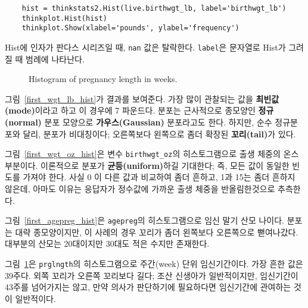 
\begin{verbatim}
    hist = thinkstats2.Hist(live.birthwgt_lb, label='birthwgt_lb')
    thinkplot.Hist(hist)
    thinkplot.Show(xlabel='pounds', ylabel='frequency')
\end{verbatim}

Hist에 인자가 판다스 시리즈일 때, {\tt nan} 값은 탈락한다. 
{\tt label}은 문자열로 Hist가 그려질 때 범례에 나타난다. 


\begin{figure}
\caption{Histogram of pregnancy length in weeks.}
\label{first_prglngth_hist}
\end{figure}

그림~\ref{first_wgt_lb_hist}가 결과를 보여준다.
가장 많이 관찰되는 값을 {\bf 최빈값(mode)}이라고 하고 이 경우에 7 파운드다. 
분포는 근사적으로 종모양인 {\bf 정규(normal)} 분포 모양으로 
{\bf 가우스(Gaussian)} 분포라고도 한다. 하지만, 순수 정규분포와 달리,
분포가 비대칭이다; 오른쪽보다 왼쪽으로 좀더 확장된 {\bf 꼬리(tail)}가 있다.


그림~\ref{first_wgt_oz_hist}은 변수 \verb"birthwgt_oz"의 히스토그램으로 출생 체중의 온스 부분이다. 
이론적으로 분포가 {\bf 균등(uniform)}하길 기대한다; 즉, 모든 값이 동일한 빈도를 가져야 한다.
사실 0 이 다른 값과 비교하여 좀더 흔하고, 1과 15는 좀더 흔하지 않은데, 아마도 이유는 응답자가 정수값에 가까운 출생 체중을 반올림한것으로 추측한다.


그림~\ref{first_agepreg_hist}은 \verb"agepreg"의 히스토그램으로 임신 말기 산모 나이다.
분포는 대략 종모양이지만, 이 사례의 경우 꼬리가 좀더 왼쪽보다 오른쪽으로 뻗여나갔다. 
대부분의 산모는 20대이지만 30대도 적은 수지만 존재한다.

 
그림~\ref{first_prglngth_hist}은 \verb"prglngth"의 히스토그램으로 주간(week) 단위 임신기간이다.
가장 흔한 값은 39주다. 외쪽 꼬리가 오른쪽 꼬리보다 길다; 조산 신생아가 일반적이지만,
임신기간이 43주를 넘어가지는 않고, 만약 의사가 판단하기에 필요하다면 임신기간에 관여하는 것이 일반적이다.



